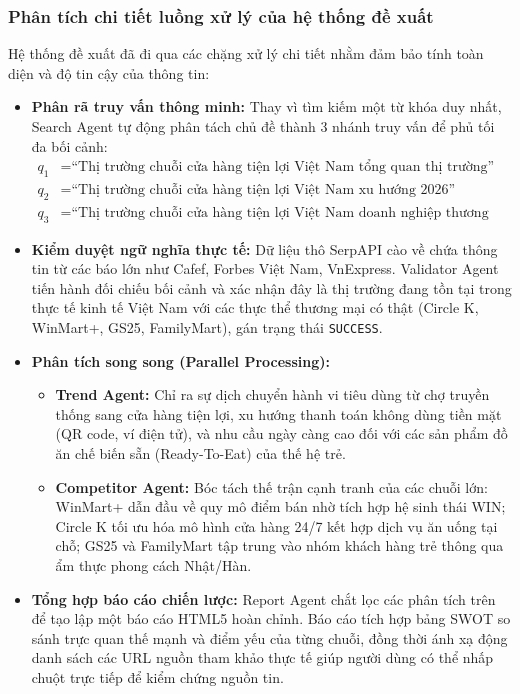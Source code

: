 \documentclass[11pt,a4paper]{article}
\begin{document}
\begin{itemize}
\subsubsection{Phân tích chi tiết luồng xử lý của hệ thống đề xuất}
Hệ thống đề xuất đã đi qua các chặng xử lý chi tiết nhằm đảm bảo tính toàn diện và độ tin cậy của thông tin:
\begin{itemize}
    \item \textbf{Phân rã truy vấn thông minh:} Thay vì tìm kiếm một từ khóa duy nhất, Search Agent tự động phân tách chủ đề thành 3 nhánh truy vấn để phủ tối đa bối cảnh:
    \begin{align}
        q_1 &= \text{``Thị trường chuỗi cửa hàng tiện lợi Việt Nam tổng quan thị trường''} \\
        q_2 &= \text{``Thị trường chuỗi cửa hàng tiện lợi Việt Nam xu hướng 2026''} \\
        q_3 &= \text{``Thị trường chuỗi cửa hàng tiện lợi Việt Nam doanh nghiệp thương hiệu lớn 2026''}
    \end{align}
    \item \textbf{Kiểm duyệt ngữ nghĩa thực tế:} Dữ liệu thô SerpAPI cào về chứa thông tin từ các báo lớn như Cafef, Forbes Việt Nam, VnExpress. Validator Agent tiến hành đối chiếu bối cảnh và xác nhận đây là thị trường đang tồn tại trong thực tế kinh tế Việt Nam với các thực thể thương mại có thật (Circle K, WinMart+, GS25, FamilyMart), gán trạng thái \texttt{SUCCESS}.
    \item \textbf{Phân tích song song (Parallel Processing):}
    \begin{itemize}
        \item \textbf{Trend Agent:} Chỉ ra sự dịch chuyển hành vi tiêu dùng từ chợ truyền thống sang cửa hàng tiện lợi, xu hướng thanh toán không dùng tiền mặt (QR code, ví điện tử), và nhu cầu ngày càng cao đối với các sản phẩm đồ ăn chế biến sẵn (Ready-To-Eat) của thế hệ trẻ.
        \item \textbf{Competitor Agent:} Bóc tách thế trận cạnh tranh của các chuỗi lớn: WinMart+ dẫn đầu về quy mô điểm bán nhờ tích hợp hệ sinh thái WIN; Circle K tối ưu hóa mô hình cửa hàng 24/7 kết hợp dịch vụ ăn uống tại chỗ; GS25 và FamilyMart tập trung vào nhóm khách hàng trẻ thông qua ẩm thực phong cách Nhật/Hàn.
    \end{itemize}
    \item \textbf{Tổng hợp báo cáo chiến lược:} Report Agent chắt lọc các phân tích trên để tạo lập một báo cáo HTML5 hoàn chỉnh. Báo cáo tích hợp bảng SWOT so sánh trực quan thế mạnh và điểm yếu của từng chuỗi, đồng thời ánh xạ động danh sách các URL nguồn tham khảo thực tế giúp người dùng có thể nhấp chuột trực tiếp để kiểm chứng nguồn tin.
\end{itemize}


\end{itemize}
\end{document}

